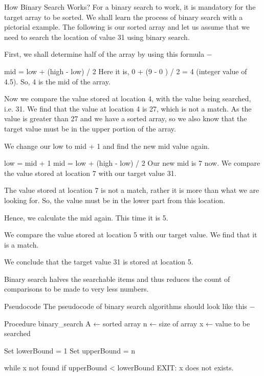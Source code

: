How Binary Search Works?
For a binary search to work, it is mandatory for the target array to be sorted. We shall learn the process of binary search with a pictorial example. The following is our sorted array and let us assume that we need to search the location of value 31 using binary search.



First, we shall determine half of the array by using this formula −

mid = low + (high - low) / 2
Here it is, 0 + (9 - 0 ) / 2 = 4 (integer value of 4.5). So, 4 is the mid of the array.



Now we compare the value stored at location 4, with the value being searched, i.e. 31. We find that the value at location 4 is 27, which is not a match. As the value is greater than 27 and we have a sorted array, so we also know that the target value must be in the upper portion of the array.



We change our low to mid + 1 and find the new mid value again.

low = mid + 1
mid = low + (high - low) / 2
Our new mid is 7 now. We compare the value stored at location 7 with our target value 31.



The value stored at location 7 is not a match, rather it is more than what we are looking for. So, the value must be in the lower part from this location.



Hence, we calculate the mid again. This time it is 5.



We compare the value stored at location 5 with our target value. We find that it is a match.



We conclude that the target value 31 is stored at location 5.

Binary search halves the searchable items and thus reduces the count of comparisons to be made to very less numbers.

Pseudocode
The pseudocode of binary search algorithms should look like this −

Procedure binary_search
   A ← sorted array
   n ← size of array
   x ← value to be searched

   Set lowerBound = 1
   Set upperBound = n

   while x not found
      if upperBound < lowerBound
         EXIT: x does not exists.

